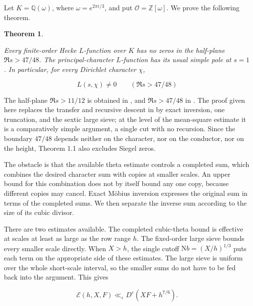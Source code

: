 \documentclass[reqno,a4paper,11pt]{amsart}
\newtheorem{theorem}{Theorem}[section]
\begin{document}
Let $K=\mathbb{Q}(\omega)$, where $\omega=e^{2\pi i/3}$, and put $\mathcal{O}=\mathbb{Z}[\omega]$. We prove the following theorem.

\begin{theorem}\label{thm:main}

Every finite-order Hecke $L$-function over $K$ has no zeros in the half-plane $\Re s>47/48$. The principal-character $L$-function has its usual simple pole at $s=1$. In particular, for every Dirichlet character $\chi $,

\begin{equation}\label{eq:1}
L\left( s,\chi \right) \ne 0\quad \quad \left( \Re s>47/48\right) 
\end{equation}

\end{theorem}

The half-plane $\Re s>11/12$ is obtained in \cite[Theorem 1.1]{theta}, and $\Re s>47/48$ in \cite[Theorem 1]{kintali}. The proof given here replaces the transfer and recursive descent in \cite[Section 5]{theta} by exact inversion, one truncation, and the sextic large sieve; at the level of the mean-square estimate it is a comparatively simple argument, a single cut with no recursion. Since the boundary $47/48$ depends neither on the character, nor on the conductor, nor on the height, Theorem 1.1 also excludes Siegel zeros.

The obstacle is that the available theta estimate controls a completed sum, which combines the desired character sum with copies at smaller scales. An upper bound for this combination does not by itself bound any one copy, because different copies may cancel. Exact Möbius inversion expresses the original sum in terms of the completed sums. We then separate the inverse sum according to the size of its cubic divisor.

There are two estimates available. The completed cubic-theta bound \cite[Proposition 5.2]{theta} is effective at scales at least as large as the row range $h$. The fixed-order large sieve \cite[Theorem 1.1]{defaveri} bounds every smaller scale directly. When $X>h$, the single cutoff $\mathrm{N}b=(X/h)^{1/3}$ puts each term on the appropriate side of these estimates. The large sieve is uniform over the whole short-scale interval, so the smaller sums do not have to be fed back into the argument. This gives

\begin{equation}\label{eq:2}
\mathcal{E}\left( h,X,F\right) {\ll }_{\varepsilon }{D}^{\varepsilon }\left( XF+{h}^{7/6}\right) .
\end{equation}
\end{document}
